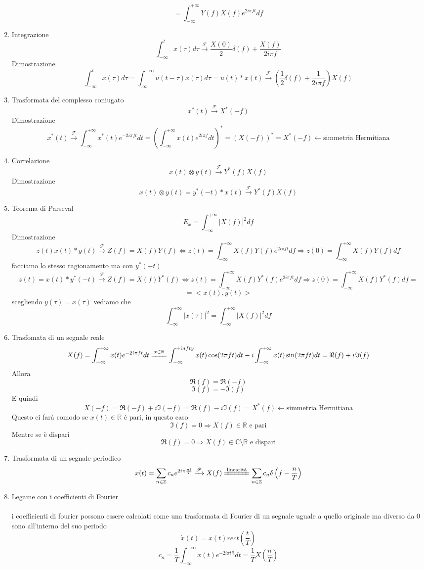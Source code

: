 \documentclass{article}
\newcommand{\accapo}{\\\hspace*{1cm}\\}
\newcommand{\trasformata}{\xrightarrow{\mathscr{F}}}
\begin{document}
\begin{enumerate}
        \[=\int_{-\infty}^{+\infty}Y(f)X(f)e^{2i\pi ft}df\]
    \item Integrazione
        \[\int_{-\infty}^{t} x(\tau)d\tau\trasformata \frac{X(0)}{2}\delta(f)+\frac{X(f)}{2i\pi f}\]
        Dimostrazione
        \[\int_{-\infty}^{t} x(\tau)d\tau=\int_{.\infty}^{+\infty}u(t-\tau)x(\tau)d\tau=u(t)*x(t)\trasformata\left(\frac{1}{2}\delta(f)+\frac{1}{2i\pi f}\right)X(f)\]
    \item Trasformata del complesso coniugato
        \[x^*(t)\trasformata X^*(-f)\]
        Dimostrazione
        \[x^*(t)\trasformata\int_{-\infty}^{+\infty}x^*(t)e^{-2i\pi ft}dt={\left(\int_{-\infty}^{+\infty}x(t)e^{2i\pi f}dt\right)}^*={(X(-f))}^*=X^*(-f)\leftarrow\text{simmetria Hermitiana}\]
    \item Correlazione
        \[x(t)\otimes y(t)\trasformata Y^*(f)X(f)\]
        Dimostrazione
        \[x(t)\otimes y(t)=y^*(-t)*x(t)\trasformata Y^*(f)X(f)\]
    \item Teorema di Parseval
        \[E_x=\int_{-\infty}^{+\infty}|X(f)|^2 df\]
        Dimostrazione
        \[z(t)x(t)*y(t)\trasformata Z(f)=X(f)Y(f)\Leftrightarrow z(t)=\int_{-\infty}^{+\infty}X(f)Y(f)e^{2i\pi ft}df\Rightarrow z(0)=\int_{-\infty}^{+\infty}X(f)Y(f)df\]
        facciamo lo stesso ragionamento ma con $y^*(-t)$
        \[z(t)=x(t)*y^*(-t)\trasformata Z(f)=X(f)Y^*(f)\Leftrightarrow z(t)=\int_{-\infty}^{+\infty}X(f)Y^*(f)e^{2i\pi ft}df\Rightarrow z(0)=\int_{-\infty}^{+\infty}X(f)Y^*(f)df=\]
        \[=<x(t),y(t)>\]
        scegliendo \(y(\tau)=x(\tau)\) vediamo che
        \[\int_{-\infty}^{+\infty}|x(\tau)|^2=\int_{-\infty}^{+\infty}|X(f)|^2 df\]
    \item Trasfomata di un segnale reale
        \[X(f)=\int_{-\infty}^{+\infty}x(t)e^{-2i\pi ft}dt\xlongequal{x\in\mathbb{R}}\int_{-\infty}^{+infty}x(t)\cos(2\pi ft)dt-i\int_{-\infty}^{+\infty}x(t)\sin(2\pi ft)dt=\Re (f)+i\Im (f)\]
        Allora
        \[\Re(f)=\Re(-f)\]
        \[\Im(f)=-\Im(f)\]
        E quindi
        \[X(-f)=\Re(-f)+i\Im(-f)=\Re(f)-i\Im(f)=X^*(f)\leftarrow\text{simmetria Hermitiana}\]
        Questo ci farà comodo se \(x(t)\in\mathbb{R}\) è pari, in questo caso
        \[\Im(f)=0\Rightarrow X(f)\in\mathbb{R}\text{ e pari}\]
        Mentre se è dispari
        \[\Re(f)=0\Rightarrow X(f)\in\mathbb{C}\setminus\mathbb{R}\text{ e dispari}\]
    \item Trasformata di un segnale periodico
        \[x(t)=\sum_{n\in\mathbb{Z}}c_n e^{2i\pi\frac{nt}{T}}\trasformata X(f)\xlongequal{\text{linearità}}\sum_{n\in\mathbb{Z}}c_n\delta\left(f-\frac{n}{T}\right)\]
    \item Legame con i coefficienti di Fourier\accapo
        i coefficienti di fourier possono essere calcolati come una trasformata di Fourier di un segnale uguale a quello originale ma diverso da 0 sono all'interno del suo periodo
        \[\dot{x}(t)=x(t)rect\left(\frac{t}{T}\right)\]
        \[c_n=\frac{1}{T}\int_{-\infty}^{+\infty}\dot{x}(t)e^{-2i\pi t\frac{n}{T}}dt=\frac{1}{T}\dot{X}\left(\frac{n}{T}\right)\]
\end{enumerate}
\end{document}

